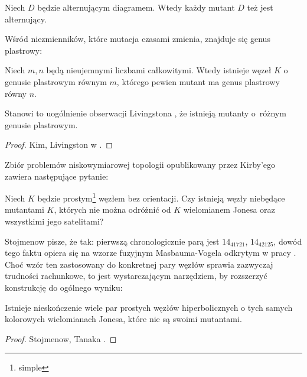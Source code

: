 \begin{proposition}
    Niech $D$ będzie alternującym diagramem.
    Wtedy każdy mutant $D$ też jest alternujący.
\end{proposition}

Wśród niezmienników, które mutacja czasami zmienia, znajduje się genus plastrowy:

\begin{proposition}
%
    Niech $m, n$ będą nieujemnymi liczbami całkowitymi.
    Wtedy istnieje węzeł $K$ o genusie plastrowym równym $m$, którego pewien mutant ma genus plastrowy równy $n$.
\end{proposition}

Stanowi to uogólnienie obserwacji Livingstona \cite{livingston83}, że istnieją mutanty o~różnym genusie plastrowym.
%

\begin{proof}
    Kim, Livingston w \cite{kim05}.
\end{proof}

Zbiór problemów niskowymiarowej topologii opublikowany przez Kirby'ego \cite{kirby78} zawiera następujące pytanie:
%

\begin{conjecture}[problem 1.91]
    Niech $K$ będzie prostym\footnote{simple} węzłem bez orientacji.
    Czy istnieją węzły niebędące mutantami $K$, których nie można odróżnić od $K$ wielomianem Jonesa oraz wszystkimi jego satelitami?
\end{conjecture}

Stojmenow pisze, że tak: pierwszą chronologicznie parą jest $14_{41721}$, $14_{42125}$, dowód tego faktu opiera się na wzorze fuzyjnym Masbauma-Vogela odkrytym w pracy \cite{masbaum94}.
%
%
Choć wzór ten zastosowany do konkretnej pary węzłów sprawia zazwyczaj trudności rachunkowe, to jest wystarczającym narzędziem, by rozszerzyć konstrukcję do ogólnego wyniku:

\begin{proposition}
    Istnieje nieskończenie wiele par prostych węzłów hiperbolicznych o tych samych kolorowych wielomianach Jonesa, które nie są swoimi mutantami.
\end{proposition}

\begin{proof}
    Stojmenow, Tanaka \cite[tw. 1.1]{tanaka09}.
\end{proof}


